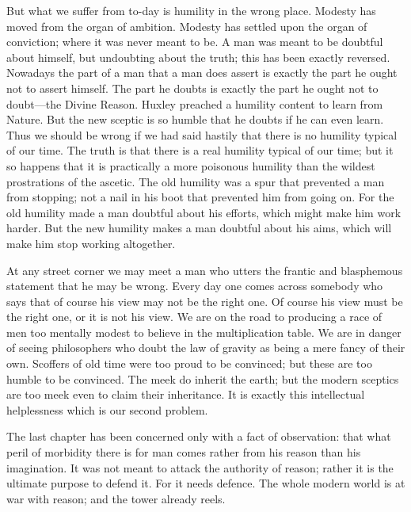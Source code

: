 But what we suffer from to-day is humility in the wrong place. Modesty has moved from the organ of ambition. Modesty has settled upon the organ of conviction; where it was never meant to be. A man was meant to be doubtful about himself, but undoubting about the truth; this has been exactly reversed. Nowadays the part of a man that a man does assert is exactly the part he ought not to assert himself. The part he doubts is exactly the part he ought not to doubt—the Divine Reason. Huxley preached a humility content to learn from Nature. But the new sceptic is so humble that he doubts if he can even learn. Thus we should be wrong if we had said hastily that there is no humility typical of our time. The truth is that there is a real humility typical of our time; but it so happens that it is practically a more poisonous humility than the wildest prostrations of the ascetic. The old humility was a spur that prevented a man from stopping; not a nail in his boot that prevented him from going on. For the old humility made a man doubtful about his efforts, which might make him work harder. But the new humility makes a man doubtful about his aims, which will make him stop working altogether.

At any street corner we may meet a man who utters the frantic and blasphemous statement that he may be wrong. Every day one comes across somebody who says that of course his view may not be the right one. Of course his view must be the right one, or it is not his view. We are on the road to producing a race of men too mentally modest to believe in the multiplication table. We are in danger of seeing philosophers who doubt the law of gravity as being a mere fancy of their own. Scoffers of old time were too proud to be convinced; but these are too humble to be convinced. The meek do inherit the earth; but the modern sceptics are too meek even to claim their inheritance. It is exactly this intellectual helplessness which is our second problem.

The last chapter has been concerned only with a fact of observation: that what peril of morbidity there is for man comes rather from his reason than his imagination. It was not meant to attack the authority of reason; rather it is the ultimate purpose to defend it. For it needs defence. The whole modern world is at war with reason; and the tower already reels.

